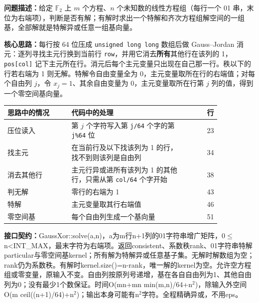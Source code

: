 \noindent\textbf{问题描述：}\allowbreak 给定 $\mathbb{F}_2$ 上 $m$ 个方程、$n$ 个未知数的线性方程组（每行一个 01 串，末位为右端项），判断是否有解；有解时求出一个特解和齐次方程组解空间的一组基，全部解就是特解异或任意一组基向量。

\textbf{核心思路：}\allowbreak 每行按 64 位压成 \texttt{unsigned long long} 数组后做 Gauss--Jordan 消元：逐列寻找主元行换到当前行 \texttt{row}，并用它消去\textbf{所有}其他行在该列的 1，\texttt{pos[col]} 记下主元所在行。消元后每个主元变量只出现在自己那一行。秩以下的行若右端为 1 则无解。特解令自由变量全为 0，主元变量取所在行的右端值；对每个自由列 $j$，令 $x_j=1$、其余自由变量为 0，主元变量取所在行第 $j$ 列的值，得到一个零空间基向量。

\begin{center}\small
\begin{tabular}{@{}p{0.30\linewidth}p{0.55\linewidth}r@{}}
\toprule
思路中的情况 & 代码中的处理 & 行\\
\midrule
压位读入 & 第 $j$ 个字符写入第 \texttt{j/64} 个字的第 \texttt{j\%64} 位 & 23\\
找主元 & 在当前行及以下找该列为 1 的行，找不到则该列是自由列 & 34\\
消去其他行 & 主元行异或进所有该列为 1 的其他行，只需从第 \texttt{col/64} 个字开始 & 38\\
判无解 & 零行的右端为 1 & 43\\
特解 & 主元变量取其行右端值 & 46\\
零空间基 & 每个自由列生成一个基向量 & 51\\
\bottomrule
\end{tabular}
\end{center}



{\sloppy{}\noindent\textbf{接口契约：}GaussXor::solve(a,n)，a为m行n+1列的01字符串增广矩阵，0$\le$n<INT\_MAX，最末字符为右端项。返回consistent、系数秩rank、01字符串特解particular与零空间基kernel；所有解为特解异或任意基子集。无解时解数组为空；rank仍为系数秩。有解时kernel.size()=n-rank，唯一解的kernel为空。允许空方程组或零变量，原输入不变。自由列按原列号递增，基在各自自由列为1、其他自由列为0；没有最少1个数保证。时间O(mn+mn min(m,n)/64+n$^{2}$)，除输入外空间O(m ceil((n+1)/64)+n$^{2}$)；输出本身可能有n$^{2}$字符。全程精确异或，不用eps。\par}

\Needspace{598pt}



